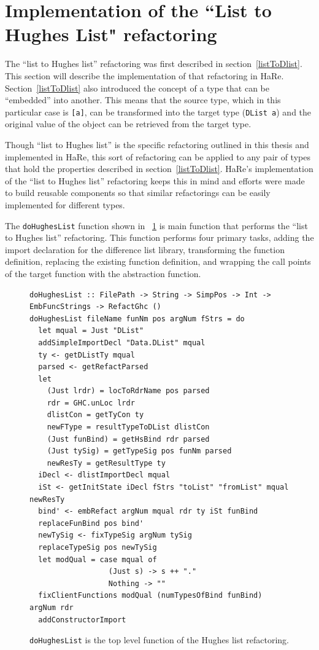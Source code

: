 \section{Implementation of the ``List to Hughes List" refactoring}
\label{sec:hughesListImp}

The ``list to Hughes list'' refactoring was first described in section~\ref{listToDlist}. This section will describe the implementation of that refactoring in HaRe. Section~\ref{listToDlist} also introduced the concept of a type that can be ``embedded'' into another. This means that the source type, which in this particular case is \texttt{[a]}, can be transformed into the target type (\texttt{DList a}) and the original value of the object can be retrieved from the target type.

Though ``list to Hughes list'' is the specific refactoring outlined in this thesis and implemented in HaRe, this sort of refactoring can be applied to any pair of types that hold the properties described in section~\ref{listToDlist}. HaRe's implementation of the ``list to Hughes list'' refactoring keeps this in mind and efforts were made to build reusable components so that similar refactorings can be easily implemented for different types.

The \texttt{doHughesList} function shown in \DIFdelbegin {}\DIFdelend \DIFaddbegin {}\DIFaddend ~\ref{doHughesList} is main function that performs the ``list to Hughes list'' refactoring. This function performs four primary tasks, adding the import declaration for the difference list library, transforming the function definition, replacing the existing function definition, and wrapping the call points of the target function with the abstraction function.

\begin{figure}[t]
\begin{lstlisting}
doHughesList :: FilePath -> String -> SimpPos -> Int -> EmbFuncStrings -> RefactGhc ()
doHughesList fileName funNm pos argNum fStrs = do
  let mqual = Just "DList"
  addSimpleImportDecl "Data.DList" mqual
  ty <- getDListTy mqual
  parsed <- getRefactParsed
  let
    (Just lrdr) = locToRdrName pos parsed
    rdr = GHC.unLoc lrdr
    dlistCon = getTyCon ty
    newFType = resultTypeToDList dlistCon 
    (Just funBind) = getHsBind rdr parsed
    (Just tySig) = getTypeSig pos funNm parsed
    newResTy = getResultType ty
  iDecl <- dlistImportDecl mqual
  iSt <- getInitState iDecl fStrs "toList" "fromList" mqual newResTy
  bind' <- embRefact argNum mqual rdr ty iSt funBind
  replaceFunBind pos bind'
  newTySig <- fixTypeSig argNum tySig
  replaceTypeSig pos newTySig
  let modQual = case mqual of
                  (Just s) -> s ++ "."
                  Nothing -> ""
  fixClientFunctions modQual (numTypesOfBind funBind) argNum rdr
  addConstructorImport
\end{lstlisting}
\caption{\texttt{doHughesList} is the top level function of the Hughes list refactoring.}
\label{doHughesList}
\end{figure}


